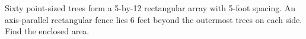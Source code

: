 Sixty point-sized trees form a 5-by-12 rectangular array with 5-foot spacing. An axis-parallel rectangular fence lies 6 feet beyond the outermost trees on each side. Find the enclosed area.
